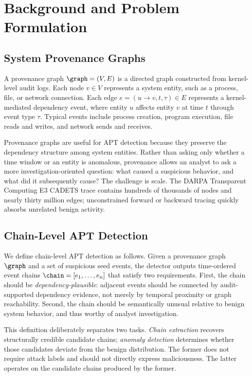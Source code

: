 \section{Background and Problem Formulation}
\label{sec:background}

\subsection{System Provenance Graphs}

A provenance graph $\graph=(V,E)$ is a directed graph constructed from kernel-level audit logs. Each node $v\in V$ represents a system entity, such as a process, file, or network connection. Each edge $e=(u\rightarrow v,t,\tau)\in E$ represents a kernel-mediated dependency event, where entity $u$ affects entity $v$ at time $t$ through event type $\tau$. Typical events include process creation, program execution, file reads and writes, and network sends and receives.

Provenance graphs are useful for APT detection because they preserve the dependency structure among system entities. Rather than asking only whether a time window or an entity is anomalous, provenance allows an analyst to ask a more investigation-oriented question: what caused a suspicious behavior, and what did it subsequently cause? The challenge is scale. The DARPA Transparent Computing E3 CADETS trace contains hundreds of thousands of nodes and nearly thirty million edges; unconstrained forward or backward tracing quickly absorbs unrelated benign activity.

\subsection{Chain-Level APT Detection}
\label{sec:problem}

We define chain-level APT detection as follows. Given a provenance graph $\graph$ and a set of suspicious seed events, the detector outputs time-ordered event chains $\chain=[e_1,\ldots,e_n]$ that satisfy two requirements. First, the chain should be \emph{dependency-plausible}: adjacent events should be connected by audit-supported dependency evidence, not merely by temporal proximity or graph reachability. Second, the chain should be semantically unusual relative to benign system behavior, and thus worthy of analyst investigation.

This definition deliberately separates two tasks. \emph{Chain extraction} recovers structurally credible candidate chains; \emph{anomaly detection} determines whether those candidates deviate from the benign distribution. The former does not require attack labels and should not directly express maliciousness. The latter operates on the candidate chains produced by the former.

